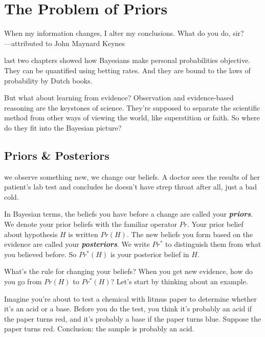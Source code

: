 \documentclass[justified]{tufte-book}
\newcommand{\p}{Pr}
\newcommand{\pr}{Pr}
\newcommand{\po}{Pr^*}
\newenvironment{epigraph}%
{
\begin{flushright}    
\begin{minipage}{20em}
\begin{flushright}
\itshape
}%
{
\end{flushright}
\end{minipage}
\end{flushright}
}
\theoremstyle{definition}
\theoremstyle{definition}
\theoremstyle{definition}
\theoremstyle{remark}
\begin{document}
\hypertarget{priors}{%
\chapter{The Problem of Priors}\label{priors}}

\begin{epigraph}
When my information changes, I alter my conclusions. What do you do,
sir?\\
---attributed to John Maynard Keynes
\end{epigraph}

 last two chapters showed how Bayesians make personal
probabilities objective. They can be quantified using betting rates. And
they are bound to the laws of probability by Dutch books.

But what about learning from evidence? Observation and evidence-based
reasoning are the keystones of science. They're supposed to separate the
scientific method from other ways of viewing the world, like
superstition or faith. So where do they fit into the Bayesian picture?

\hypertarget{priors-posteriors}{%
\section{Priors \& Posteriors}\label{priors-posteriors}}

 we observe something new, we change our beliefs. A
doctor sees the results of her patient's lab test and concludes he
doesn't have strep throat after all, just a bad cold.

In Bayesian terms, the beliefs you have before a change are called your
\textbf{\emph{priors}}. We denote your prior beliefs with the familiar
operator \(\pr\). Your prior belief about hypothesis \(H\) is written
\(\p(H)\). The new beliefs you form based on the evidence are called
your \textbf{\emph{posteriors}}. We write \(\po\) to distinguish them
from what you believed before. So \(\po(H)\) is your posterior belief in
\(H\).

What's the rule for changing your beliefs? When you get new evidence,
how do you go from \(\pr(H)\) to \(\po(H)\)? Let's start by thinking
about an example.

Imagine you're about to test a chemical with litmus paper to determine
whether it's an acid or a base. Before you do the test, you think it's
probably an acid if the paper turns red, and it's probably a base if the
paper turns blue. Suppose the paper turns red. Conclusion: the sample is
probably an acid.
\end{document}
